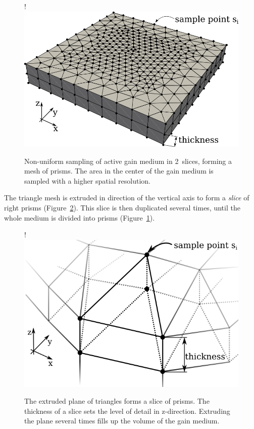 \begin{figure}[H]
  \centerline{
     {!} {\includegraphics{graphics/samples_reduced.png}}
  }
  \caption{Non-uniform sampling of active gain medium in 2~slices,
    forming a mesh of prisms. The area in the center of the gain medium
    is sampled with a higher spatial resolution.}
  \label{graphic:samples_reduced}
\end{figure}
The triangle mesh is extruded in direction of the vertical axis to form a
\emph{slice} of right prisms (Figure~\ref{graphic:extruded_mesh}). This
slice is then duplicated several times, until the whole medium is divided into
prisms (Figure~\ref{graphic:samples_reduced}).

\begin{figure}[H]
  \centerline{
     {!} {\includegraphics{graphics/delauny_4.png}}
  }
  \caption{The extruded plane of triangles forms a slice of
    prisms. The thickness of a slice sets the level of detail in
    z-direction. Extruding the plane several times fills up the volume
    of the gain medium.}
  \label{graphic:extruded_mesh}
\end{figure}


